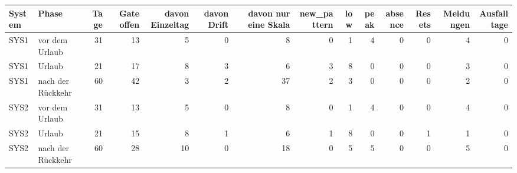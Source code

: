 \begin{tabular}{llrrrrrrrrrrrr}
\toprule
System & Phase & Tage & Gate offen & davon Einzeltag & davon Drift & davon nur eine Skala & new\_pattern & low & peak & absence & Resets & Meldungen & Ausfalltage \\
\midrule
SYS1 & vor dem Urlaub & 31 & 13 & 5 & 0 & 8 & 0 & 1 & 4 & 0 & 0 & 4 & 0 \\
SYS1 & Urlaub & 21 & 17 & 8 & 3 & 6 & 3 & 8 & 0 & 0 & 0 & 3 & 0 \\
SYS1 & nach der Rückkehr & 60 & 42 & 3 & 2 & 37 & 2 & 3 & 0 & 0 & 0 & 2 & 0 \\
SYS2 & vor dem Urlaub & 31 & 13 & 5 & 0 & 8 & 0 & 1 & 4 & 0 & 0 & 4 & 0 \\
SYS2 & Urlaub & 21 & 15 & 8 & 1 & 6 & 1 & 8 & 0 & 0 & 1 & 1 & 0 \\
SYS2 & nach der Rückkehr & 60 & 28 & 10 & 0 & 18 & 0 & 5 & 5 & 0 & 0 & 5 & 0 \\
\bottomrule
\end{tabular}
